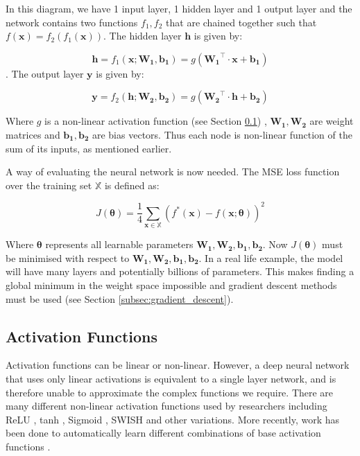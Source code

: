 In this diagram, we have 1 input layer, 1 hidden layer and 1 output layer and the network contains two functions $f_1, f_2$ that are chained together such that $f(\bm{x}) = f_2(f_1(\bm{x}))$.
The hidden layer $\bm{h}$ is given by:

\begin{equation}
    \bm{h} = f_1(\bm{x}; \bm{W_1}, \bm{b_1}) = g(\bm{W_1}^\top \cdot \bm{x} + \bm{b_1})
    \label{eq:hidden_layer}
\end{equation}
.
The output layer $\bm{y}$ is given by:

\begin{equation}
    \bm{y} = f_2(\bm{h}; \bm{W_2}, \bm{b_2}) = g(\bm{W_2}^\top \cdot \bm{h} + \bm{b_2})
    \label{eq:output_layer}
\end{equation}

Where $g$ is a non-linear activation function (see Section \ref{subsec:activation_function}) , $\bm{W_1}, \bm{W_2}$ are weight matrices and $\bm{b_1}, \bm{b_2}$ are bias vectors.
Thus each node is non-linear function of the sum of its inputs, as mentioned earlier.

A way of evaluating the neural network is now needed.
The MSE loss function over the training set $\mathbb{X}$ is defined as:

\begin{equation}
    J(\bm{\theta}) = \frac{1}{4} \sum_{\bm{x} \in \mathbb{X}} (f^*(\bm{x}) - f(\bm{x}; \bm{\theta}))^2
    \label{mse_loss_function}
\end{equation}

Where $\bm{\theta}$ represents all learnable parameters $\bm{W_1}, \bm{W_2}, \bm{b_1}, \bm{b_2}$.
Now $J(\bm{\theta})$ must be minimised with respect to $\bm{W_1}, \bm{W_2}, \bm{b_1}, \bm{b_2}$.
In a real life example, the model will have many layers and potentially billions of parameters.
This makes finding a global minimum in the weight space impossible and gradient descent methods must be used (see Section \ref{subsec:gradient_descent}).

\subsection{Activation Functions}\label{subsec:activation_function}

Activation functions can be linear or non-linear.
However, a deep neural network that uses only linear activations is equivalent to a single layer network, and is therefore unable to approximate the complex functions we require.
There are many different non-linear activation functions used by researchers including ReLU \cite{Jarrett_Kavukcuoglu_Lecun}, tanh \cite{LeCun_Bottou_Orr_Muller_1998}, Sigmoid \cite{Han_Moraga_1995}, SWISH \cite{Ramachandran_Zoph_Le_2017} and other variations.
More recently, work has been done to automatically learn different combinations of base activation functions \cite{Manessi_Rozza_2018}.

